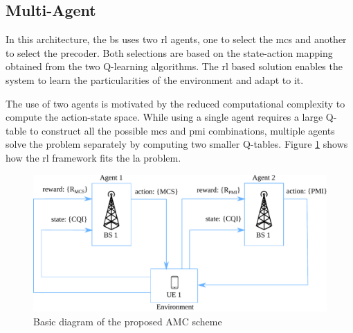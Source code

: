 \subsection{Multi-Agent}

In this architecture, the \gls{bs} uses two \gls{rl} agents, one to select the \gls{mcs} and another to select the precoder.
%
Both selections are based on the state-action mapping obtained from the two Q-learning algorithms.
%
The \gls{rl} based solution enables the system to learn the particularities of the environment and adapt to it.


The use of two agents is motivated by the reduced computational complexity to compute the action-state space.
%
While using a single agent requires a large Q-table to construct all the possible \gls{mcs} and \gls{pmi} combinations, multiple agents solve the problem separately by computing two smaller Q-tables.
%
Figure \ref{fig:la-rl-frame} shows how the \gls{rl} framework fits the \gls{la} problem.

%
\begin{figure}[!hb]
	\centerline{\includegraphics[width=\columnwidth]{figures/chp_la/rl-framework-mateus.pdf}}
	\caption{Basic diagram of the proposed AMC scheme}
	\label{fig:la-rl-frame}
\end{figure}
%

